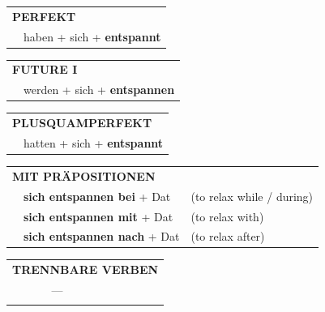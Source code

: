 \documentclass[10pt,a4paper]{revtex4-2}
\begin{document}
\begin{verbbox}
 \begin{tabular}{rl}
     \multicolumn{2}{l}{\textbf{PERFEKT}}\\
   & haben + sich + \textbf{entspannt}\\
  \end{tabular}
\hfill
   \begin{tabular}{rl}
   
    \multicolumn{2}{l}{\textbf{FUTURE I} }\\
   & werden + sich + \textbf{entspannen}\\
 
  \end{tabular}
\hfill
   \begin{tabular}{rl}
      \multicolumn{2}{l}{\textbf{PLUSQUAMPERFEKT}}\\
   & hatten + sich + \textbf{entspannt}\\
  \end{tabular}

   \vspace{10pt}

   \begin{tabular}{lll}
      \multicolumn{3}{l}{\textbf{MIT PRÄPOSITIONEN}}\\
& \textbf{sich entspannen bei} + Dat & (to relax while / during)\\
& \textbf{sich entspannen mit} + Dat & (to relax with)\\
& \textbf{sich entspannen nach} + Dat & (to relax after)\\
\end{tabular}
  \hfill
\begin{tabular}{lll}
\multicolumn{3}{l}{\textbf{TRENNBARE VERBEN}}\\
& ---\\
\vspace{20pt}
\end{tabular}


  \vspace{-5pt}

\end{verbbox}
\end{document}
